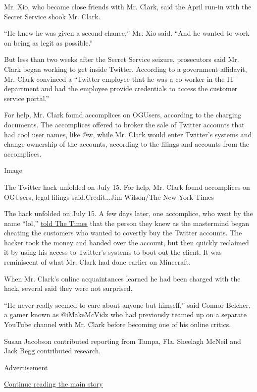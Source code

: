 Mr. Xio, who became close friends with Mr. Clark, said the April run-in
with the Secret Service shook Mr. Clark.

``He knew he was given a second chance,'' Mr. Xio said. ``And he wanted
to work on being as legit as possible.''

But less than two weeks after the Secret Service seizure, prosecutors
said Mr. Clark began working to get inside Twitter. According to a
government affidavit, Mr. Clark convinced a ``Twitter employee that he
was a co-worker in the IT department and had the employee provide
credentials to access the customer service portal.''

For help, Mr. Clark found accomplices on OGUsers, according to the
charging documents. The accomplices offered to broker the sale of
Twitter accounts that had cool user names, like @w, while Mr. Clark
would enter Twitter's systems and change ownership of the accounts,
according to the filings and accounts from the accomplices.

Image

The Twitter hack unfolded on July 15. For help, Mr. Clark found
accomplices on OGUsers, legal filings said.Credit...Jim Wilson/The New
York Times

The hack unfolded on July 15. A few days later, one accomplice, who went
by the name ``lol,''
\href{https://www.nytimes3xbfgragh.onion/2020/07/17/technology/twitter-hackers-interview.html}{told
The Times} that the person they knew as the mastermind began cheating
the customers who wanted to covertly buy the Twitter accounts. The
hacker took the money and handed over the account, but then quickly
reclaimed it by using his access to Twitter's systems to boot out the
client. It was reminiscent of what Mr. Clark had done earlier on
Minecraft.

When Mr. Clark's online acquaintances learned he had been charged with
the hack, several said they were not surprised.

``He never really seemed to care about anyone but himself,'' said Connor
Belcher, a gamer known as @iMakeMcVidz who had previously teamed up on a
separate YouTube channel with Mr. Clark before becoming one of his
online critics.

Susan Jacobson contributed reporting from Tampa, Fla. Sheelagh McNeil
and Jack Begg contributed research.

Advertisement

\protect\hyperlink{after-bottom}{Continue reading the main story}

